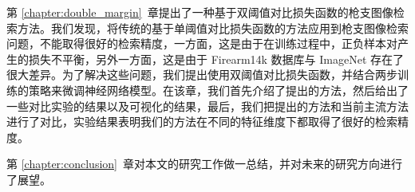第 \ref{chapter:double_margin}~章提出了一种基于双阈值对比损失函数的枪支图像检索方法。我们发现，将传统的基于单阈值对比损失函数的方法应用到枪支图像检索问题，不能取得很好的检索精度，一方面，这是由于在训练过程中，正负样本对产生的损失不平衡，另外一方面，这是由于 Firearm14k 数据库与 ImageNet 存在了很大差异。为了解决这些问题，我们提出使用双阈值对比损失函数，并结合两步训练的策略来微调神经网络模型。在该章，我们首先介绍了提出的方法，然后给出了一些对比实验的结果以及可视化的结果，最后，我们把提出的方法和当前主流方法进行了对比，实验结果表明我们的方法在不同的特征维度下都取得了很好的检索精度。

第 \ref{chapter:conclusion}~章对本文的研究工作做一总结，并对未来的研究方向进行了展望。
